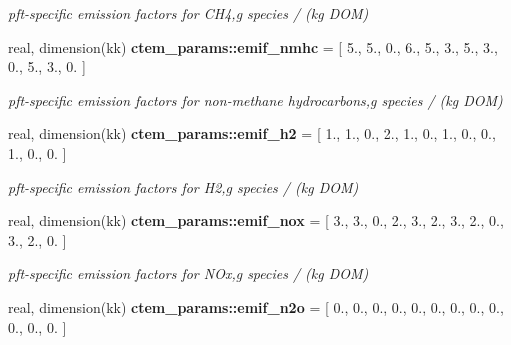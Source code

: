 \begin{DoxyCompactItemize}
\begin{DoxyCompactList}\small\item\em pft-\/specific emission factors for C\+H4,g species / (kg D\+O\+M) \end{DoxyCompactList}\item 
\hypertarget{namespacectem__params_a2e0fa2f6a9ef11fc839062a5649e17e7}{}real, dimension(kk) {\bfseries ctem\+\_\+params\+::emif\+\_\+nmhc} = \mbox{[} 5., 5., 0., 6., 5., 3., 5., 3., 0., 5., 3., 0. \mbox{]}\label{namespacectem__params_a2e0fa2f6a9ef11fc839062a5649e17e7}

\begin{DoxyCompactList}\small\item\em pft-\/specific emission factors for non-\/methane hydrocarbons,g species / (kg D\+O\+M) \end{DoxyCompactList}\item 
\hypertarget{namespacectem__params_a69c1ddbe45fc93ced2664f1fb1781431}{}real, dimension(kk) {\bfseries ctem\+\_\+params\+::emif\+\_\+h2} = \mbox{[} 1., 1., 0., 2., 1., 0., 1., 0., 0., 1., 0., 0. \mbox{]}\label{namespacectem__params_a69c1ddbe45fc93ced2664f1fb1781431}

\begin{DoxyCompactList}\small\item\em pft-\/specific emission factors for H2,g species / (kg D\+O\+M) \end{DoxyCompactList}\item 
\hypertarget{namespacectem__params_a1c3efd30262fdc33811b8179c691fa23}{}real, dimension(kk) {\bfseries ctem\+\_\+params\+::emif\+\_\+nox} = \mbox{[} 3., 3., 0., 2., 3., 2., 3., 2., 0., 3., 2., 0. \mbox{]}\label{namespacectem__params_a1c3efd30262fdc33811b8179c691fa23}

\begin{DoxyCompactList}\small\item\em pft-\/specific emission factors for N\+Ox,g species / (kg D\+O\+M) \end{DoxyCompactList}\item 
\hypertarget{namespacectem__params_a6b6a432b4e081591d12a9699cadd5c19}{}real, dimension(kk) {\bfseries ctem\+\_\+params\+::emif\+\_\+n2o} = \mbox{[} 0., 0., 0., 0., 0., 0., 0., 0., 0., 0., 0., 0. \mbox{]}\label{namespacectem__params_a6b6a432b4e081591d12a9699cadd5c19}


\end{DoxyCompactItemize}
